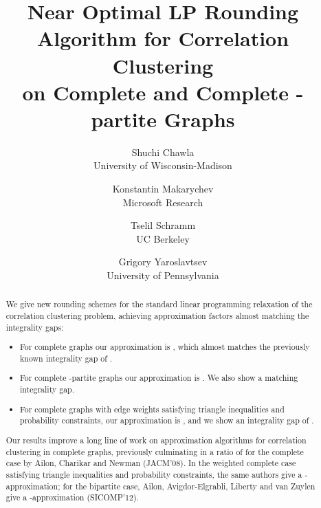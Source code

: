 \documentclass[11pt]{article}
\theoremstyle{definition}
\theoremstyle{remark}
\begin{document}
\title{Near Optimal LP Rounding Algorithm for Correlation Clustering\\on Complete and
Complete -partite Graphs}
\author{Shuchi Chawla \\ University of Wisconsin-Madison \and Konstantin Makarychev\\ Microsoft Research\and Tselil Schramm \\ UC Berkeley \and Grigory Yaroslavtsev \\ University of Pennsylvania}
\date{\textbf{\small{}}}


\maketitle


\begin{abstract}
We give new rounding schemes for the standard linear programming relaxation of
the correlation clustering problem, achieving approximation factors almost
matching the integrality gaps:
\begin{itemize}
\item For complete graphs our approximation is , which
	almost matches the previously known integrality gap of .
\item For complete -partite graphs our approximation is . We also show a
	matching integrality gap.
\item For complete graphs with edge weights satisfying triangle inequalities
	and probability constraints, our approximation is , and we show an
	integrality gap of .
\end{itemize}
Our results improve a long line of work on approximation algorithms for
correlation clustering in complete graphs, previously culminating in a ratio of
 for the complete case by Ailon, Charikar and Newman (JACM'08).  In the
weighted complete case satisfying triangle inequalities and probability
constraints, the same authors give a -approximation; for the bipartite case,
Ailon, Avigdor-Elgrabli, Liberty and van Zuylen give a -approximation
(SICOMP'12).
\end{abstract}

\setcounter{page}{0}
\thispagestyle{empty} \pagebreak

\tableofcontents

\pagebreak
\end{document}
